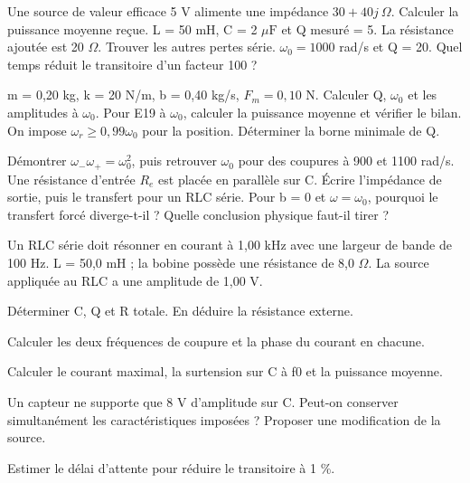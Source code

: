 Une source de valeur efficace 5 V alimente une impédance $30+40j\ \Omega$. Calculer la puissance moyenne reçue.
L = 50 mH, C = 2 $\mu\mathrm F$ et Q mesuré = 5. La résistance ajoutée est 20 $\Omega$. Trouver les autres pertes série.
$\omega_0=1000$ rad/s et Q = 20. Quel temps réduit le transitoire d’un facteur 100 ?


m = 0,20 kg, k = 20 N/m, b = 0,40 kg/s, $F_m=0{,}10$ N. Calculer Q, $\omega_0$ et les amplitudes à $\omega_0$.
Pour E19 à $\omega_0$, calculer la puissance moyenne et vérifier le bilan.
On impose $\omega_r\geq0{,}99\omega_0$ pour la position. Déterminer la borne minimale de Q.


Démontrer $\omega_-\omega_+=\omega_0^2$, puis retrouver $\omega_0$ pour des coupures à 900 et 1100 rad/s.
Une résistance d’entrée $R_e$ est placée en parallèle sur C. Écrire l’impédance de sortie, puis le transfert pour un RLC série.
Pour b = 0 et $\omega=\omega_0$, pourquoi le transfert forcé diverge-t-il ? Quelle conclusion physique faut-il tirer ?


\label{ch06-ex-D1}
Un RLC série doit résonner en courant à 1,00 kHz avec une largeur de bande de 100 Hz. L = 50,0 mH ; la bobine possède une résistance de 8,0 $\Omega$. La source appliquée au RLC a une amplitude de 1,00 V.\begin{questions}
\item Déterminer C, Q et R totale. En déduire la résistance externe.
\item Calculer les deux fréquences de coupure et la phase du courant en chacune.
\item Calculer le courant maximal, la surtension sur C à f0 et la puissance moyenne.
\item Un capteur ne supporte que 8 V d’amplitude sur C. Peut-on conserver simultanément les caractéristiques imposées ? Proposer une modification de la source.
\item Estimer le délai d’attente pour réduire le transitoire à 1 \%.
\end{questions}


